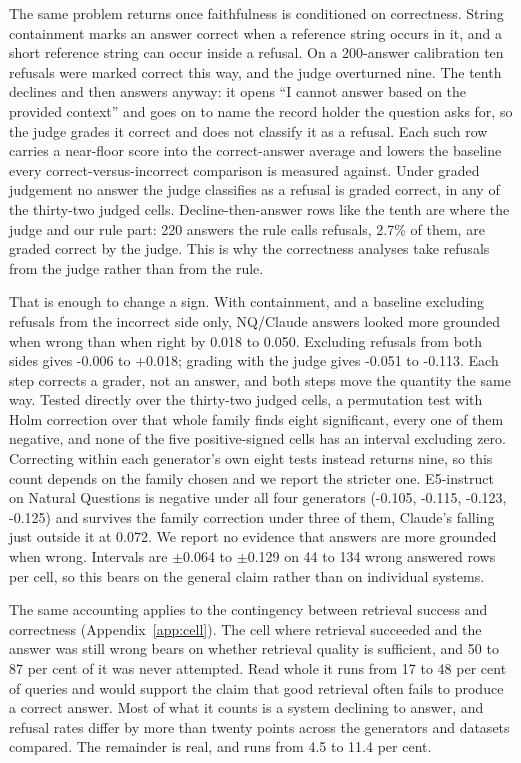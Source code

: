 \label{sec:refusals}

The same problem returns once faithfulness is conditioned on correctness. String containment marks an answer correct when a reference string occurs in it, and a short reference string can occur inside a refusal. On a 200-answer calibration ten refusals were marked correct this way, and the judge overturned nine. The tenth declines and then answers anyway: it opens ``I cannot answer based on the provided context'' and goes on to name the record holder the question asks for, so the judge grades it correct and does not classify it as a refusal. Each such row carries a near-floor score into the correct-answer average and lowers the baseline every correct-versus-incorrect comparison is measured against. Under graded judgement no answer the judge classifies as a refusal is graded correct, in any of the thirty-two judged cells. Decline-then-answer rows like the tenth are where the judge and our rule part: 220 answers the rule calls refusals, 2.7\% of them, are graded correct by the judge. This is why the correctness analyses take refusals from the judge rather than from the rule.

That is enough to change a sign. With containment, and a baseline excluding refusals from the incorrect side only, NQ/Claude answers looked more grounded when wrong than when right by 0.018 to 0.050. Excluding refusals from both sides gives -0.006 to +0.018; grading with the judge gives -0.051 to -0.113. Each step corrects a grader, not an answer, and both steps move the quantity the same way. Tested directly over the thirty-two judged cells, a permutation test with Holm correction over that whole family finds eight significant, every one of them negative, and none of the five positive-signed cells has an interval excluding zero. Correcting within each generator's own eight tests instead returns nine, so this count depends on the family chosen and we report the stricter one. E5-instruct on Natural Questions is negative under all four generators (-0.105, -0.115, -0.123, -0.125) and survives the family correction under three of them, Claude's falling just outside it at 0.072. We report no evidence that answers are more grounded when wrong. Intervals are $\pm$0.064 to $\pm$0.129 on 44 to 134 wrong answered rows per cell, so this bears on the general claim rather than on individual systems.

The same accounting applies to the contingency between retrieval success and correctness (Appendix~\ref{app:cell}). The cell where retrieval succeeded and the answer was still wrong bears on whether retrieval quality is sufficient, and 50 to 87 per cent of it was never attempted. Read whole it runs from 17 to 48 per cent of queries and would support the claim that good retrieval often fails to produce a correct answer. Most of what it counts is a system declining to answer, and refusal rates differ by more than twenty points across the generators and datasets compared. The remainder is real, and runs from 4.5 to 11.4 per cent.
